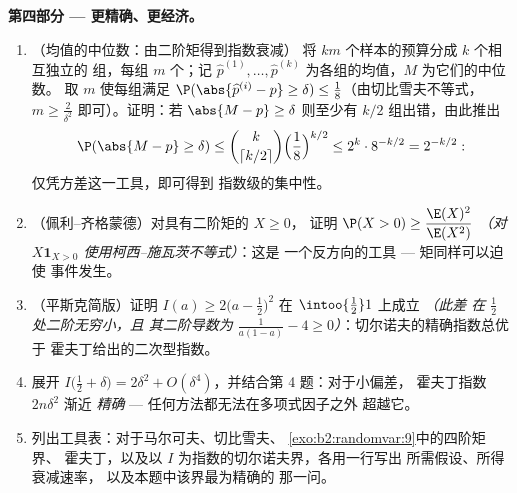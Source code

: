 \begin{problem}
\medskip
\noindent\textbf{第四部分 --- 更精确、更经济。}
\begin{enumerate}[resume]
  \item （均值的中位数：由二阶矩得到指数衰减）
        将 $km$ 个样本的预算分成 $k$ 个相互独立的
        组，每组 $m$ 个；记 $\widehat p^{(1)}, \dots, \widehat
        p^{(k)}$ 为各组的均值，$M$ 为它们的中位数。
        取 $m$ 使每组满足
        $\P(\abs{\widehat p^{(i)} - p} \geq \delta) \leq
        \frac18$（由切比雪夫不等式，$m \geq \frac2{\delta^2}$
        即可）。证明：若 $\abs{M - p} \geq \delta$
        则至少有 $k/2$ 组出错，由此推出
        \[
        \P(\abs{M - p} \geq \delta)
        \leq \binom{k}{\lceil k/2\rceil}\Bigl(\frac18
        \Bigr)^{k/2}
        \leq 2^k\cdot 8^{-k/2} = 2^{-k/2} :
        \]
        仅凭方差这一工具，即可得到
        指数级的集中性。
  \item （佩利–齐格蒙德）对具有二阶矩的 $X \geq 0$，
        证明 $\P(X > 0) \geq \dfrac{\E(X)^2}{\E(X^2)}$
        \emph{（对 $X\mathbf 1_{X>0}$ 使用柯西–施瓦茨不等式）}：这是
        一个反方向的工具 --- 矩同样可以迫使
        事件发生。
  \item （平斯克简版）证明 $I(a) \geq 2\bigl(a -
        \tfrac12\bigr)^2$ 在 $\intoo{\frac12}1$ 上成立 \emph{（此差
        在 $\frac12$ 处二阶无穷小，且
        其二阶导数为 $\frac1{a(1-a)} - 4 \geq
        0$）}：切尔诺夫的精确指数总优于
        霍夫丁给出的二次型指数。
  \item 展开 $I\bigl(\tfrac12 + \delta\bigr) = 2\delta^2 +
        O(\delta^4)$，并结合第 4 题：对于小偏差，
        霍夫丁指数 $2n\delta^2$ 渐近
        \emph{精确} --- 任何方法都无法在多项式因子之外
        超越它。
  \item 列出工具表：对于马尔可夫、切比雪夫、
        \cref{exo:b2:randomvar:9}中的四阶矩界、
        霍夫丁，以及以 $I$ 为指数的切尔诺夫界，各用一行写出
        所需假设、所得衰减速率，
        以及本题中该界最为精确的
        那一问。
\end{enumerate}


\end{problem}
